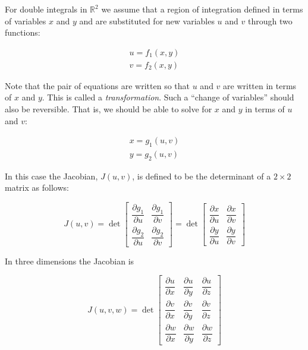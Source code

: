 \documentclass{article}
\theoremstyle{definition}
\begin{document}
\bigskip
\noindent
For double integrals in $\mathbb{R}^2$ we assume that a region of
integration defined in terms of variables $x$ and $y$ and are
substituted for new variables $u$ and $v$ through two functions:

\medskip
\begin{equation*}
\begin{array}{llll}
u = f_1(x,y) \\
[5pt]
v = f_2(x,y)
\end{array}
\end{equation*}

\bigskip
\noindent 
Note that the pair of equations are written so that $u$ and $v$
are written in terms of $x$ and $y$.  This is called a
\emph{transformation}. Such a “change of variables” should also
be reversible.  That is, we should be able to solve for $x$ and
$y$ in terms of $u$ and $v$:

\medskip
\begin{equation*}
\begin{array}{llll}
x = g_1(u,v)  \\
[5pt]
y = g_2(u,v)
\end{array}
\end{equation*}

\bigskip
\noindent
In this case the Jacobian, $J(u,v)$, is defined to be the
determinant of a $2 \times 2$ matrix as follows:

\bigskip
\begin{equation*}
J(u,v)
= \det
\begin{bmatrix}
  \dfrac{\partial g_1}{\partial u} & \dfrac{\partial g_1}{\partial v} \\[2ex]
  \dfrac{\partial g_2}{\partial u} & \dfrac{\partial g_2}{\partial v} 
\end{bmatrix}
= \det
\begin{bmatrix}
  \dfrac{\partial x}{\partial u} & \dfrac{\partial x}{\partial v} \\[2ex]
  \dfrac{\partial y}{\partial u} & \dfrac{\partial y}{\partial v} 
\end{bmatrix}
\end{equation*}

\bigskip
\noindent
In three dimensions the Jacobian is

\bigskip
\begin{equation*}
J(u,v,w) = \det
\begin{bmatrix}
  \dfrac{\partial u}{\partial x}  & \dfrac{\partial u}{\partial y} & \dfrac{\partial u}{\partial z} \\[2ex] 
  \dfrac{\partial v}{\partial x}  & \dfrac{\partial v}{\partial y} & \dfrac{\partial v}{\partial z} \\[2ex]
  \dfrac{\partial w}{\partial x} & \dfrac{\partial w}{\partial y} & \dfrac{\partial w}{\partial z}
\end{bmatrix}
\end{equation*}
\end{document}
